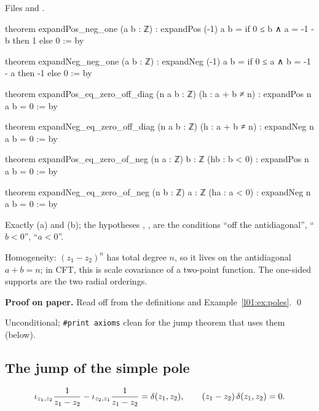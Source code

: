 \noindent Files  and
.
\begin{leancode}
theorem expandPos_neg_one (a b : ℤ) :
    expandPos (-1) a b = if 0 ≤ b ∧ a = -1 - b then 1 else 0 := by

theorem expandNeg_neg_one (a b : ℤ) :
    expandNeg (-1) a b = if 0 ≤ a ∧ b = -1 - a then -1 else 0 := by

theorem expandPos_eq_zero_off_diag (n a b : ℤ) (h : a + b ≠ n) : expandPos n a b = 0 := by

theorem expandNeg_eq_zero_off_diag (n a b : ℤ) (h : a + b ≠ n) : expandNeg n a b = 0 := by

theorem expandPos_eq_zero_of_neg (n a : ℤ) {b : ℤ} (hb : b < 0) : expandPos n a b = 0 := by

theorem expandNeg_eq_zero_of_neg (n b : ℤ) {a : ℤ} (ha : a < 0) : expandNeg n a b = 0 := by
\end{leancode}

\begin{dictionary}
Exactly (a) and (b); the hypotheses , ,  are the conditions ``off the antidiagonal'',
``$b<0$'', ``$a<0$''.
\end{dictionary}

\begin{physics}
Homogeneity: $(z_1-z_2)^n$ has total degree $n$, so it lives on the antidiagonal $a+b = n$; in CFT, this is
scale covariance of a two-point function. The one-sided supports are the two radial orderings.
\end{physics}

\textbf{Proof on paper.} Read off from the definitions and Example~\ref{l01:ex:poles}. \qed

\begin{status}
Unconditional; \texttt{\#print axioms} clean for the jump theorem that uses them (below).
\end{status}

\subsection{The jump of the simple pole}

\begin{theorem}\label{l01:thm:jump}
\begin{equation*}
  \iota_{z_1,z_2}\frac1{z_1-z_2}-\iota_{z_2,z_1}\frac1{z_1-z_2} = \delta(z_1,z_2),
  \qquad (z_1-z_2)\,\delta(z_1,z_2) = 0 .
\end{equation*}
\end{theorem}

